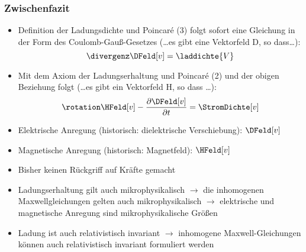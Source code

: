 \begin{frame}
  \frametitle{Zwischenfazit}
\begin{itemize}[<+->]
\item Definition der Ladungsdichte und Poincaré (3) folgt sofort eine Gleichung in der Form des Coulomb-Gauß-Gesetzes (\dots es gibt eine Vektorfeld D, so dass\dots):
  \begin{equation*}
    \divergenz\DFeld[v]=\laddichte{V}
\end{equation*}
  
\item Mit dem Axiom der Ladungserhaltung und Poincaré (2) und der obigen Beziehung folgt (\dots es gibt ein Vektorfeld H, so dass \dots ):
  \begin{equation*}
    \rotation\HFeld[v] - \frac{\partial \DFeld[v]}{\partial t} = \StromDichte[v]
\end{equation*}
  
\item Elektrische Anregung (historisch: dielektrische Verschiebung): \(\DFeld[v] \)
\item Magnetische Anregung (historisch: Magnetfeld): \(\HFeld[v] \) 
\item Bisher keinen Rückgriff auf Kräfte gemacht
\item Ladungserhaltung gilt auch mikrophysikalisch \(\to\) die inhomogenen Maxwellgleichungen gelten auch mikrophysikalisch \(\to\) elektrische und magnetische Anregung sind mikrophysikalische Größen
\item Ladung ist auch relativistisch invariant \(\to\) inhomogene Maxwell-Gleichungen können auch relativistisch invariant formuliert werden
\end{itemize}
\end{frame}


